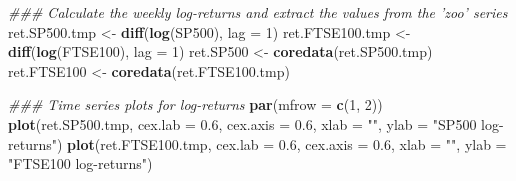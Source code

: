\documentclass[]{article}
\newenvironment{Shaded}{\begin{snugshade}}{\end{snugshade}}
\newcommand{\CommentTok}[1]{\textcolor[rgb]{0.56,0.35,0.01}{\textit{#1}}}
\newcommand{\DataTypeTok}[1]{\textcolor[rgb]{0.13,0.29,0.53}{#1}}
\newcommand{\DecValTok}[1]{\textcolor[rgb]{0.00,0.00,0.81}{#1}}
\newcommand{\FloatTok}[1]{\textcolor[rgb]{0.00,0.00,0.81}{#1}}
\newcommand{\KeywordTok}[1]{\textcolor[rgb]{0.13,0.29,0.53}{\textbf{#1}}}
\newcommand{\NormalTok}[1]{#1}
\newcommand{\StringTok}[1]{\textcolor[rgb]{0.31,0.60,0.02}{#1}}
\begin{document}
\begin{Shaded}
\begin{Highlighting}[]
{\CommentTok{### Calculate the weekly log-returns and extract the values from the 'zoo' series}
\NormalTok{ret.SP500.tmp <-}\StringTok{ }\KeywordTok{diff}\NormalTok{(}\KeywordTok{log}\NormalTok{(SP500), }\DataTypeTok{lag =} \DecValTok{1}\NormalTok{)}
\NormalTok{ret.FTSE100.tmp <-}\StringTok{ }\KeywordTok{diff}\NormalTok{(}\KeywordTok{log}\NormalTok{(FTSE100), }\DataTypeTok{lag =} \DecValTok{1}\NormalTok{)}
\NormalTok{ret.SP500 <-}\StringTok{ }\KeywordTok{coredata}\NormalTok{(ret.SP500.tmp)}
\NormalTok{ret.FTSE100 <-}\StringTok{ }\KeywordTok{coredata}\NormalTok{(ret.FTSE100.tmp)}

\CommentTok{### Time series plots for log-returns}
\KeywordTok{par}\NormalTok{(}\DataTypeTok{mfrow =} \KeywordTok{c}\NormalTok{(}\DecValTok{1}\NormalTok{, }\DecValTok{2}\NormalTok{))}
\KeywordTok{plot}\NormalTok{(ret.SP500.tmp, }\DataTypeTok{cex.lab =} \FloatTok{0.6}\NormalTok{, }\DataTypeTok{cex.axis =} \FloatTok{0.6}\NormalTok{, }\DataTypeTok{xlab =} \StringTok{""}\NormalTok{, }\DataTypeTok{ylab =} \StringTok{"SP500 log-returns"}\NormalTok{)}
\KeywordTok{plot}\NormalTok{(ret.FTSE100.tmp, }\DataTypeTok{cex.lab =} \FloatTok{0.6}\NormalTok{, }\DataTypeTok{cex.axis =} \FloatTok{0.6}\NormalTok{, }\DataTypeTok{xlab =} \StringTok{""}\NormalTok{, }\DataTypeTok{ylab =} \StringTok{"FTSE100 log-returns"}\NormalTok{)}

}
\end{Highlighting}
\end{Shaded}
\end{document}
